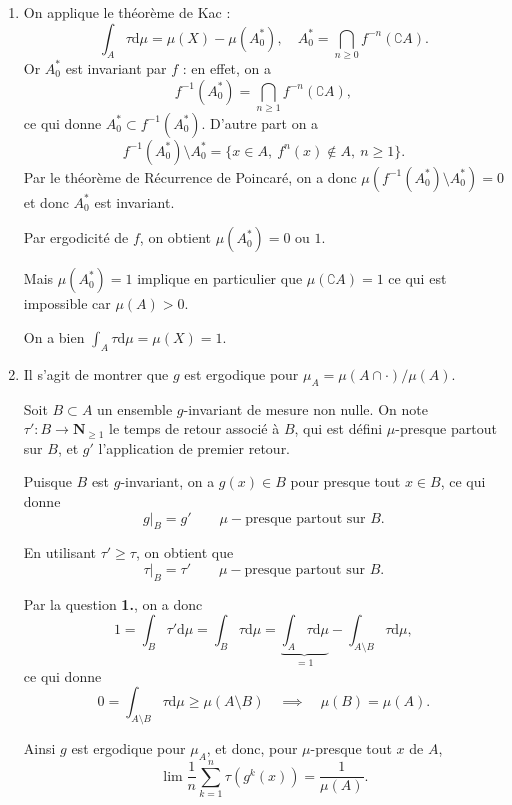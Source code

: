 \documentclass[a4paper,12pt,openany]{article}
\theoremstyle{plain}
\theoremstyle{definition}
\newcommand{\dd}{\mathrm{d}}
\newcommand{\N}{\mathbf{N}}
\begin{document}
\begin{enumerate}
\item On applique le th\'eor\`eme de Kac :
$$
\int_A \tau \dd \mu = \mu(X) - \mu(A_0^*), \quad A_0^* = \bigcap_{n \geqslant 0} f^{-n}(\complement A).
$$
 Or $A_0^*$ est invariant par $f$ : en effet, on a
$$
f^{-1}(A_0^*) = \bigcap_{n \geqslant 1} f^{-n}(\complement A),
$$
 ce qui donne $A_0^* \subset f^{-1}(A_0^*)$. D'autre part on a
$$
f^{-1}(A_0^*) \setminus A_0^* = \{x \in A,~f^n(x) \notin A,~n \geqslant 1\}.
$$
 Par le th\'eor\`eme de R\'ecurrence de Poincar\'e, on a donc $\mu(f^{-1}(A_0^*) \setminus A_0^*) = 0$ et donc $A_0^*$ est invariant.  

Par ergodicit\'e de $f$, on obtient $\mu(A_0^*) = 0$ ou $1$.  

Mais $\mu(A_0^*) = 1$ implique en particulier que $\mu(\complement A) = 1$ ce qui est impossible car $\mu(A) > 0.$  

On a bien $\int_A \tau \dd \mu = \mu(X) = 1.$
\item Il s'agit de montrer que $g$ est ergodique pour $\mu_A = \mu(A \cap \cdot) / \mu(A).$  

Soit $B \subset A$ un ensemble $g$-invariant de mesure non nulle. On note $\tau' : B \to \N_{\geqslant 1}$ le temps de retour associ\'e \`a $B$, qui est d\'efini $\mu$-presque partout sur $B$, et $g'$ l'application de premier retour.  

Puisque $B$ est $g$-invariant, on a $g(x) \in B$ pour presque tout $x \in B$, ce qui donne 
$$
g|_B = g' \quad \quad \mu-\text{presque partout sur }B.
$$ 

En utilisant $\tau' \geqslant \tau$, on obtient que
$$
\tau|_B = \tau' \quad \quad \mu-\text{presque partout sur }B.
$$
 
Par la question \textbf{1.}, on a donc 
$$
1 = \int_B \tau' \dd \mu = \int_B \tau \dd \mu = \underset{=1}{\underbrace{\int_A \tau \dd \mu}} - \int_{A \setminus B} \tau \dd \mu,
$$
 ce qui donne 
$$
0 = \int_{A\setminus B}\tau \dd \mu \geqslant \mu(A \setminus B) \quad \implies \quad \mu(B) = \mu(A).
$$



Ainsi $g$ est ergodique pour $\mu_A$, et donc, pour $\mu$-presque tout $x$ de $A$,
$$
\lim \frac{1}{n} \sum_{k=1}^n \tau\left(g^k(x)\right) = \frac{1}{\mu(A)}.
$$

\end{enumerate}

 \vspace{1.5mm}
\end{document}
